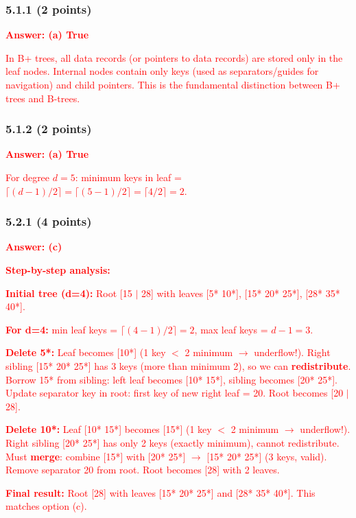 \documentclass[11pt,a4paper]{article}
\begin{document}
\subsubsection*{5.1.1 (2 points)}
\textcolor{red}{\textbf{Answer: (a) True}}

\textcolor{red}{In B+ trees, all data records (or pointers to data records) are stored only in the leaf nodes. Internal nodes contain only keys (used as separators/guides for navigation) and child pointers. This is the fundamental distinction between B+ trees and B-trees.}

\subsubsection*{5.1.2 (2 points)}
\textcolor{red}{\textbf{Answer: (a) True}}

\textcolor{red}{For degree $d = 5$: minimum keys in leaf = $\lceil (d-1)/2 \rceil = \lceil (5-1)/2 \rceil = \lceil 4/2 \rceil = 2$.}

\subsubsection*{5.2.1 (4 points)}
\textcolor{red}{\textbf{Answer: (c)}}

\textcolor{red}{\textbf{Step-by-step analysis:}}

\textcolor{red}{\textbf{Initial tree (d=4):} Root [15 $|$ 28] with leaves [5* 10*], [15* 20* 25*], [28* 35* 40*].}

\textcolor{red}{\textbf{For d=4:} min leaf keys = $\lceil (4-1)/2 \rceil = 2$, max leaf keys = $d-1 = 3$.}

\textcolor{red}{\textbf{Delete 5*:} Leaf becomes [10*] (1 key $<$ 2 minimum $\rightarrow$ underflow!).
Right sibling [15* 20* 25*] has 3 keys (more than minimum 2), so we can \textbf{redistribute}.
Borrow 15* from sibling: left leaf becomes [10* 15*], sibling becomes [20* 25*].
Update separator key in root: first key of new right leaf = 20.
Root becomes [20 $|$ 28].}

\textcolor{red}{\textbf{Delete 10*:} Leaf [10* 15*] becomes [15*] (1 key $<$ 2 minimum $\rightarrow$ underflow!).
Right sibling [20* 25*] has only 2 keys (exactly minimum), cannot redistribute.
Must \textbf{merge}: combine [15*] with [20* 25*] $\rightarrow$ [15* 20* 25*] (3 keys, valid).
Remove separator 20 from root. Root becomes [28] with 2 leaves.}

\textcolor{red}{\textbf{Final result:} Root [28] with leaves [15* 20* 25*] and [28* 35* 40*]. This matches option (c).}
\end{document}

